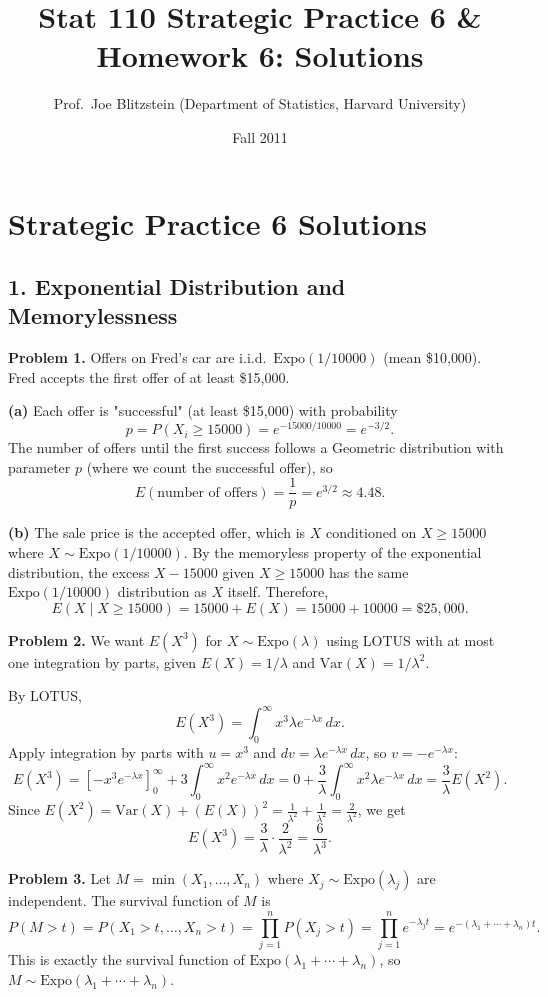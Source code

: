 \documentclass{article}
\title{Stat 110 Strategic Practice 6 \& Homework 6: Solutions}
\author{Prof.\ Joe Blitzstein (Department of Statistics, Harvard University)}
\date{Fall 2011}
\begin{document}
\maketitle

\section*{Strategic Practice 6 Solutions}

\subsection*{1. Exponential Distribution and Memorylessness}

\textbf{Problem 1.} Offers on Fred's car are i.i.d.\ $\text{Expo}(1/10000)$ (mean \$10{,}000). Fred accepts the first offer of at least \$15{,}000.

\textbf{(a)} Each offer is "successful" (at least \$15{,}000) with probability
$$
p = P(X_i \ge 15000) = e^{-15000/10000} = e^{-3/2}.
$$
The number of offers until the first success follows a Geometric distribution with parameter $p$ (where we count the successful offer), so
$$
E(\text{number of offers}) = \frac{1}{p} = e^{3/2} \approx 4.48.
$$

\textbf{(b)} The sale price is the accepted offer, which is $X$ conditioned on $X \ge 15000$ where $X \sim \text{Expo}(1/10000)$. By the memoryless property of the exponential distribution, the excess $X - 15000$ given $X \ge 15000$ has the same $\text{Expo}(1/10000)$ distribution as $X$ itself. Therefore,
$$
E(X \mid X \ge 15000) = 15000 + E(X) = 15000 + 10000 = \$25{,}000.
$$

\bigskip
\textbf{Problem 2.} We want $E(X^3)$ for $X \sim \text{Expo}(\lambda)$ using LOTUS with at most one integration by parts, given $E(X) = 1/\lambda$ and $\text{Var}(X) = 1/\lambda^2$.

By LOTUS,
$$
E(X^3) = \int_0^\infty x^3 \lambda e^{-\lambda x}\,dx.
$$
Apply integration by parts with $u = x^3$ and $dv = \lambda e^{-\lambda x}\,dx$, so $v = -e^{-\lambda x}$:
$$
E(X^3) = \left[-x^3 e^{-\lambda x}\right]_0^\infty + 3\int_0^\infty x^2 e^{-\lambda x}\,dx = 0 + \frac{3}{\lambda}\int_0^\infty x^2 \lambda e^{-\lambda x}\,dx = \frac{3}{\lambda}E(X^2).
$$
Since $E(X^2) = \text{Var}(X) + (E(X))^2 = \frac{1}{\lambda^2} + \frac{1}{\lambda^2} = \frac{2}{\lambda^2}$, we get
$$
E(X^3) = \frac{3}{\lambda}\cdot\frac{2}{\lambda^2} = \frac{6}{\lambda^3}.
$$

\bigskip
\textbf{Problem 3.} Let $M = \min(X_1, \dots, X_n)$ where $X_j \sim \text{Expo}(\lambda_j)$ are independent. The survival function of $M$ is
$$
P(M > t) = P(X_1 > t, \dots, X_n > t) = \prod_{j=1}^n P(X_j > t) = \prod_{j=1}^n e^{-\lambda_j t} = e^{-(\lambda_1 + \cdots + \lambda_n)t}.
$$
This is exactly the survival function of $\text{Expo}(\lambda_1 + \cdots + \lambda_n)$, so $M \sim \text{Expo}(\lambda_1 + \cdots + \lambda_n)$.
\end{document}
